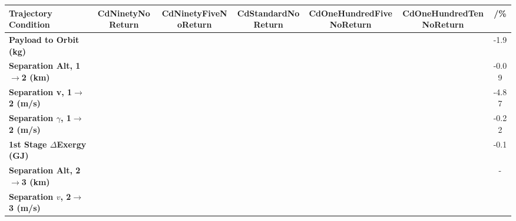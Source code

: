 \begin{table}[ht!]
	\centering
	\begin{tabular}{l c c c c c c} 
		\hline \textbf{Trajectory Condition}
		&CdNinetyNoReturn
		&CdNinetyFiveNoReturn
		&CdStandardNoReturn
		&CdOneHundredFiveNoReturn
		&CdOneHundredTenNoReturn
		& /\%
		\\
		\hline \textbf{Payload to Orbit (kg)}
		& \PayloadToOrbitCdNinetyNoReturn
		& \PayloadToOrbitCdNinetyFiveNoReturn
		& \PayloadToOrbitCdStandardNoReturn
		& \PayloadToOrbitCdOneHundredFiveNoReturn
		& \PayloadToOrbitCdOneHundredTenNoReturn
		&-1.9
		\\
		\textbf{Separation Alt, 1$\rightarrow$2 (km)}
		& \firstsecondSeparationAltCdNinetyNoReturn
		& \firstsecondSeparationAltCdNinetyFiveNoReturn
		& \firstsecondSeparationAltCdStandardNoReturn
		& \firstsecondSeparationAltCdOneHundredFiveNoReturn
		& \firstsecondSeparationAltCdOneHundredTenNoReturn
		&-0.09
		\\
		\textbf{Separation v, 1$\rightarrow$2 (m/s)}
		& \firstsecondSeparationvCdNinetyNoReturn
		& \firstsecondSeparationvCdNinetyFiveNoReturn
		& \firstsecondSeparationvCdStandardNoReturn
		& \firstsecondSeparationvCdOneHundredFiveNoReturn
		& \firstsecondSeparationvCdOneHundredTenNoReturn
		&-4.87
		\\
		\textbf{Separation $\gamma$, 1$\rightarrow$2 (m/s)}
		& \firstsecondSeparationgammaCdNinetyNoReturn
		& \firstsecondSeparationgammaCdNinetyFiveNoReturn
		& \firstsecondSeparationgammaCdStandardNoReturn
		& \firstsecondSeparationgammaCdOneHundredFiveNoReturn
		& \firstsecondSeparationgammaCdOneHundredTenNoReturn
		&-0.22
		\\
		\textbf{1st Stage $\Delta$Exergy (GJ)}
		& \firstdExergyCdNinetyNoReturn
		& \firstdExergyCdNinetyFiveNoReturn
		& \firstdExergyCdStandardNoReturn
		& \firstdExergyCdOneHundredFiveNoReturn
		& \firstdExergyCdOneHundredTenNoReturn
		&-0.1
		\\
		\textbf{Separation Alt, 2$\rightarrow$3 (km)}
		& \secondthirdSeparationAltCdNinetyNoReturn
		& \secondthirdSeparationAltCdNinetyFiveNoReturn
		& \secondthirdSeparationAltCdStandardNoReturn
		& \secondthirdSeparationAltCdOneHundredFiveNoReturn
		& \secondthirdSeparationAltCdOneHundredTenNoReturn
		& -
		\\
		\textbf{Separation $v$, 2$\rightarrow$3 (m/s)}
		& \secondthirdSeparationvCdNinetyNoReturn
		& \secondthirdSeparationvCdNinetyFiveNoReturn
		& \secondthirdSeparationvCdStandardNoReturn
		& \secondthirdSeparationvCdOneHundredFiveNoReturn
		& \secondthirdSeparationvCdOneHundredTenNoReturn

\end{tabular}
\end{table}
